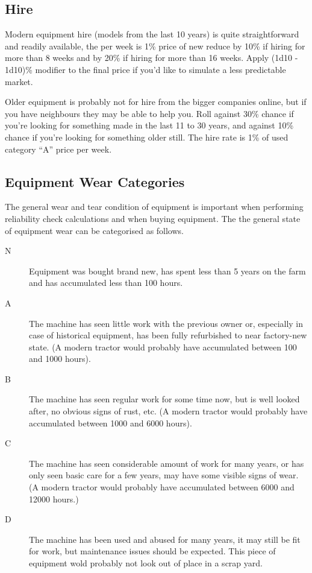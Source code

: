 \documentclass[a4paper,10pt]{article}
\begin{document}
\subsection{Hire}

Modern equipment hire (models from the last 10 years) is quite straightforward
and readily available, the per week is 1\% price of new reduce by 10\% if hiring
for more than 8 weeks and by 20\% if hiring for more than 16 weeks. Apply (1d10
- 1d10)\% modifier to the final price if you'd like to simulate a less
predictable market.

Older equipment is probably not for hire from the bigger companies online, but
if you have neighbours they may be able to help you. Roll against 30\% chance if
you're looking for something made in the last 11 to 30 years, and against 10\%
chance if you're looking for something older still. The hire rate is 1\% of used
category ``A'' price per week.

\subsection{Equipment Wear Categories}

The general wear and tear condition of equipment is important when performing
reliability check calculations and when buying equipment. The the general state
of equipment wear can be categorised as follows.
\begin{description}
\item[N] Equipment was bought brand new, has spent less than 5 years on the
  farm and has accumulated less than 100 hours.
\item[A] The machine has seen little work with the previous owner or,
  especially in case of historical equipment, has been fully refurbished to near
  factory-new state. (A modern tractor would probably have accumulated between
  100 and 1000 hours).
\item[B] The machine has seen regular work for some time now, but is well
  looked after, no obvious signs of rust, etc. (A modern tractor would probably
  have accumulated between 1000 and 6000 hours).
\item[C] The machine has seen considerable amount of work for many years, or
  has only seen basic care for a few years, may have some visible signs of wear.
  (A modern tractor would probably have accumulated between 6000 and 12000
  hours.)
\item[D] The machine has been used and abused for many years, it may still be
  fit for work, but maintenance issues should be expected. This piece of
  equipment wold probably not look out of place in a scrap yard.
\end{description}
\end{document}
